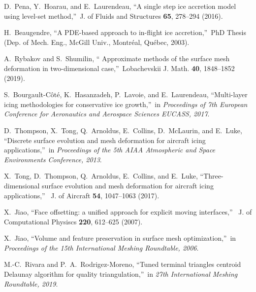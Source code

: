 \documentclass[
11pt,
tightenlines,
twoside,
onecolumn,
nofloats,
nobibnotes,
nofootinbib,
superscriptaddress,
noshowpacs,
centertags]
{revtex4-2}
\begin{document}
\begin{thebibliography}{99}
D.~Pena, Y.~Hoarau, and E.~Laurendeau, \textquotedblleft A  single
step ice accretion model using level-set method,\textquotedblright \
J. of Fluids and Structures {\bf 65}, 278--294 (2016).

 H.~Beaugendre, \textquotedblleft A PDE-based approach
to in-flight ice accretion,\textquotedblright \ PhD Thesis (Dep. of
Mech. Eng., McGill Univ., Montr\'eal, Qu\'ebec, 2003).

 A.~Rybakov and S.~Shumilin, \textquotedblleft
Approximate  methods of the surface mesh deformation in
two-dimensional case,\textquotedblright \ Lobachevskii J. Math. {\bf
40}, 1848--1852 (2019).

 S.~Bourgault-C\^ot\'e, K.~Hasanzadeh, P.~Lavoie,
and E.~Laurendeau, \textquotedblleft Multi-layer  icing
methodologies for conservative ice growth,\textquotedblright \ in
\textit{Proceedings of 7th European Conference for Aeronautics and
Aerospace Sciences EUCASS, 2017}.

 D.~Thompson, X.~Tong, Q.~Arnoldus, E.~Collins,
D.~McLaurin, and E.~Luke, \textquotedblleft Discrete  surface
evolution and mesh deformation for aircraft icing
applications,\textquotedblright \ in \textit{Proceedings of the 5th
AIAA Atmospheric and Space Environments Conference, 2013}.

 X.~Tong, D.~Thompson, Q.~Arnoldus, E.~Collins, and
E.~Luke, \textquotedblleft Three-dimensional  surface evolution and
mesh deformation for aircraft icing applications,\textquotedblright
\ J. of Aircraft {\bf 54}, 1047--1063 (2017).

 X.~Jiao, \textquotedblleft Face offsetting: a
unified approach  for explicit moving interfaces,\textquotedblright
\ J. of Computational Physiscs {\bf 220}, 612--625 (2007).

 X.~Jiao, \textquotedblleft Volume and feature
preservation in  surface mesh optimization,\textquotedblright \ in
\textit{Proceedings of the 15th International Meshing Roundtable,
2006}.

 M.-C.~Rivara and P.~A.~Rodrigez-Moreno,
\textquotedblleft Tuned terminal  triangles centroid Delaunay
algorithm for quality triangulation,\textquotedblright \ in
\textit{27th International Meshing Roundtable, 2019}.


\end{thebibliography}
\end{document}
